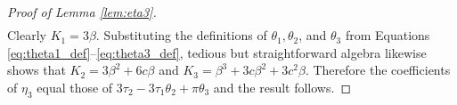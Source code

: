 \documentclass[12pt]{article}
\begin{document}
\begin{proof}[Proof of Lemma \ref{lem:eta3}]
\begin{align*}
\end{align*}
Clearly $K_1 = 3\beta$.
Substituting the definitions of $\theta_1, \theta_2$, and $\theta_3$ from Equations \ref{eq:theta1_def}--\ref{eq:theta3_def}, tedious but straightforward algebra likewise shows that $K_2 = 3\beta^2 + 6c\beta$ and $K_3 = \beta^3 + 3c\beta^2 + 3c^2\beta$.
Therefore the coefficients of $\eta_3$ equal those of $3\tau_2 - 3\tau_1 \theta_2 + \pi \theta_3$ and the result follows.
\end{proof}
\end{document}
